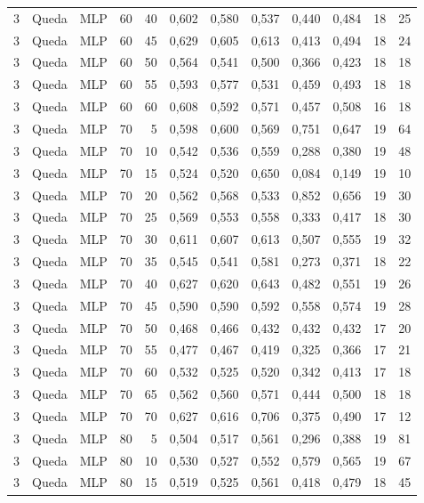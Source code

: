 \begin{longtable}{@{}rllrrrrrrrrr@{}}
3 & Queda & MLP & 60 & 40 & 0,602 & 0,580 & 0,537 & 0,440 & 0,484 & 18 & 25 \\
3 & Queda & MLP & 60 & 45 & 0,629 & 0,605 & 0,613 & 0,413 & 0,494 & 18 & 24 \\
3 & Queda & MLP & 60 & 50 & 0,564 & 0,541 & 0,500 & 0,366 & 0,423 & 18 & 18 \\
3 & Queda & MLP & 60 & 55 & 0,593 & 0,577 & 0,531 & 0,459 & 0,493 & 18 & 18 \\
3 & Queda & MLP & 60 & 60 & 0,608 & 0,592 & 0,571 & 0,457 & 0,508 & 16 & 18 \\
3 & Queda & MLP & 70 & 5 & 0,598 & 0,600 & 0,569 & 0,751 & 0,647 & 19 & 64 \\
3 & Queda & MLP & 70 & 10 & 0,542 & 0,536 & 0,559 & 0,288 & 0,380 & 19 & 48 \\
3 & Queda & MLP & 70 & 15 & 0,524 & 0,520 & 0,650 & 0,084 & 0,149 & 19 & 10 \\
3 & Queda & MLP & 70 & 20 & 0,562 & 0,568 & 0,533 & 0,852 & 0,656 & 19 & 30 \\
3 & Queda & MLP & 70 & 25 & 0,569 & 0,553 & 0,558 & 0,333 & 0,417 & 18 & 30 \\
3 & Queda & MLP & 70 & 30 & 0,611 & 0,607 & 0,613 & 0,507 & 0,555 & 19 & 32 \\
3 & Queda & MLP & 70 & 35 & 0,545 & 0,541 & 0,581 & 0,273 & 0,371 & 18 & 22 \\
3 & Queda & MLP & 70 & 40 & 0,627 & 0,620 & 0,643 & 0,482 & 0,551 & 19 & 26 \\
3 & Queda & MLP & 70 & 45 & 0,590 & 0,590 & 0,592 & 0,558 & 0,574 & 19 & 28 \\
3 & Queda & MLP & 70 & 50 & 0,468 & 0,466 & 0,432 & 0,432 & 0,432 & 17 & 20 \\
3 & Queda & MLP & 70 & 55 & 0,477 & 0,467 & 0,419 & 0,325 & 0,366 & 17 & 21 \\
3 & Queda & MLP & 70 & 60 & 0,532 & 0,525 & 0,520 & 0,342 & 0,413 & 17 & 18 \\
3 & Queda & MLP & 70 & 65 & 0,562 & 0,560 & 0,571 & 0,444 & 0,500 & 18 & 18 \\
3 & Queda & MLP & 70 & 70 & 0,627 & 0,616 & 0,706 & 0,375 & 0,490 & 17 & 12 \\
3 & Queda & MLP & 80 & 5 & 0,504 & 0,517 & 0,561 & 0,296 & 0,388 & 19 & 81 \\
3 & Queda & MLP & 80 & 10 & 0,530 & 0,527 & 0,552 & 0,579 & 0,565 & 19 & 67 \\
3 & Queda & MLP & 80 & 15 & 0,519 & 0,525 & 0,561 & 0,418 & 0,479 & 18 & 45 \\

\end{longtable}
